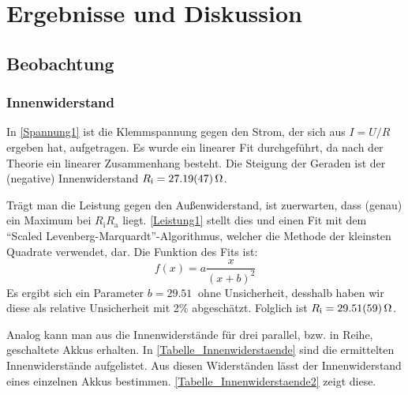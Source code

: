 \documentclass[
	a4paper,
	12pt,
	pagesize,
	ngerman
]{scrartcl}
\begin{document}
	\section{Ergebnisse und Diskussion}
	\subsection{Beobachtung}
	\subsubsection{Innenwiderstand}
	In \cref{Spannung1} ist die Klemmspannung gegen den Strom, der sich aus $I = U/R$ ergeben hat, aufgetragen. 
	Es wurde ein linearer Fit durchgeführt, da nach der Theorie ein linearer Zusammenhang besteht. 
	Die Steigung der Geraden ist der (negative) Innenwiderstand $R_\text{i} = \SI{27,19 \pm 0,47}{\Omega}$.

	Trägt man die Leistung gegen den Außenwiderstand, ist zuerwarten, dass (genau) ein Maximum bei $R_\text{i}  R_\text{a}$ liegt.
	\cref{Leistung1} stellt dies und einen Fit mit dem \enquote{Scaled Levenberg-Marquardt}-Algorithmus, welcher die Methode der kleinsten Quadrate verwendet, dar. 
	Die Funktion des Fits ist:
	\begin{equation}
		f(x)=a\frac{x}{(x+b)^2}
	\end{equation}
	Es ergibt sich ein Parameter $b = \SI{29,51}{}$ ohne Unsicherheit, desshalb haben wir diese als relative Unsicherheit mit 2\% abgeschätzt. 
	Folglich ist $R_\text{i} = \SI{29,51 \pm 0,59}{\Omega}$.

	Analog kann man aus  die Innenwiderstände für drei parallel, bzw. in Reihe, geschaltete Akkus erhalten.
	In \cref{Tabelle_Innenwiderstaende} sind die ermittelten Innenwiderstände aufgelistet. 
	Aus diesen Widerständen lässt der Innenwiderstand eines einzelnen Akkus bestimmen.
	\cref{Tabelle_Innenwiderstaende2} zeigt diese. %
\end{document}
